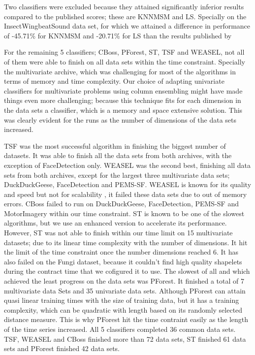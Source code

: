 Two classifiers were excluded because they attained significantly inferior results compared to the published scores; these are KNNMSM and LS.
Specially on the InsectWingbeatSound data set, for which we attained a difference in performance of -45.71\% for KNNMSM and -20.71\% for LS than the results published by \cite{bagnall2017great}


For the remaining 5 classifiers; CBoss, PForest, ST, TSF and WEASEL, not all of them were able to finish on all data sets within the time constraint.
Specially the multivariate archive, which was challenging for most of the algorithms in terms of memory and time complexity.
Our choice of adapting univariate classifiers for multivariate problems using column ensembling might have made things even more challenging;
because this technique fits for each dimension in the data sets a classifier, which is a memory and space extensive solution.
This was clearly evident for the runs as the number of dimensions of the data sets increased.

TSF was the most successful algorithm in finishing the biggest number of datasets. It was able to finish all the data sets from both archives, with the exception of FaceDetection only.
WEASEL was the second best, finishing all data sets from both archives, except for the largest three multivariate data sets; DuckDuckGeese, FaceDetection and PEMS-SF.
WEASEL is known for its quality and speed but not for scalability \cite{lucas2019proximity}, it failed these data sets due to out of memory errors.
CBoss failed to run on DuckDuckGeese, FaceDetection, PEMS-SF and MotorImagery within our time constraint.
ST is known to be one of the slowest algorithms, but we use an enhanced version to accelerate its performance. However, ST was not able to finish within our time limit on 15 multivariate datasets; due to its linear time complexity with the number of dimensions. It hit the limit of the time constraint once the number dimensions reached 6.
It has also failed on the Fungi dataset, because it couldn't find high quality shapelets during the contract time that we cofigured it to use.
The slowest of all and which achieved the least progress on the data sets was PForest. It finished a total of 7 multivariate data Sets and 35 univariate data sets.
Although PForest can attain quasi linear training times with the size of training data, but it has a training complexity, which can be quadratic with length based on its randomly selected distance measure.
This is why PForest hit the time contraint easily as the length of the time series increased.
All 5 classifiers completed 36 common data sets. TSF, WEASEL and CBoss finished more than 72 data sets, ST finished 61 data sets and PForest finished 42 data sets.

